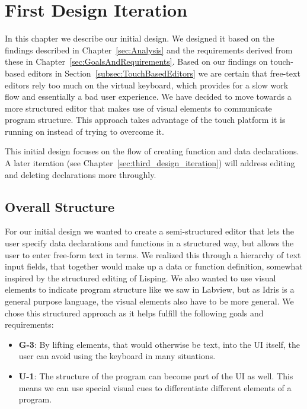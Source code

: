 \chapter{First Design Iteration}
\label{sec:InitialDesign}

In this chapter we describe our initial design. 
We designed it based on the findings described in Chapter~\ref{sec:Analysis} and the requirements derived from these in Chapter~\ref{sec:GoalsAndRequirements}.
Based on our findings on touch-based editors in Section~\ref{subsec:TouchBasedEditors} we are certain that free-text editors rely too much on the virtual keyboard, which provides for a slow work flow and essentially a bad user experience.
We have decided to move towards a more structured editor that makes use of
visual elements to communicate program structure. This approach takes
advantage of the touch platform it is running on instead of trying to overcome
it.

This initial design focuses on the flow of creating function and data declarations. A later iteration (see Chapter~\ref{sec:third_design_iteration}) will address editing and deleting declarations more throughly.

\section{Overall Structure}
For our initial design we wanted to create a semi-structured editor that lets the user specify data declarations and functions in a structured way, but allows the user to enter free-form text
in terms.
We realized this through a hierarchy of text input fields, that together would make up a data or function definition, somewhat inspired by the structured editing of Lisping.
We also wanted to use visual elements to indicate program structure like we saw in Labview, but as Idris is a general purpose language, the visual elements also have to be more general.
We chose this structured approach as it helps fulfill the following goals and requirements:
\begin{itemize}
	\item \textbf{G-3}: By lifting elements, that would otherwise be text, into the UI itself, the user can avoid using the keyboard in many situations.
	\item \textbf{U-1}: The structure of the program can become part of the UI as well. 
	This means we can use special visual cues to differentiate different elements of a program. 
\end{itemize}

